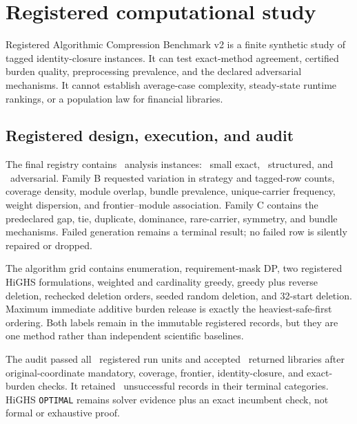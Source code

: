 \section{Registered computational study}
\label{sec:computational-study}
\label{sec:experiments}

Registered Algorithmic Compression Benchmark v2 is a finite synthetic study of
tagged identity-closure instances. It can test exact-method agreement, certified
burden quality, preprocessing prevalence, and the declared adversarial
mechanisms. It cannot establish average-case complexity, steady-state runtime
rankings, or a population law for financial libraries.

\subsection{Registered design, execution, and audit}

The final registry contains \AORBenchmarkInstances\ analysis instances:
\AORBenchmarkSmallExact\ small exact, \AORBenchmarkStructured\ structured,
and \AORBenchmarkAdversarial\ adversarial. Family B requested variation in
strategy and tagged-row counts, coverage density, module overlap, bundle
prevalence, unique-carrier frequency, weight dispersion, and
frontier--module association. Family C contains the predeclared gap, tie,
duplicate, dominance, rare-carrier, symmetry, and bundle mechanisms. Failed
generation remains a terminal result; no failed row is silently repaired or
dropped.

The algorithm grid contains enumeration, requirement-mask DP, two registered
HiGHS formulations, weighted and cardinality greedy, greedy plus reverse
deletion, rechecked deletion orders, seeded random deletion, and 32-start
deletion. Maximum immediate additive burden release is exactly the
heaviest-safe-first ordering. Both labels remain in the immutable registered
records, but they are one method rather than independent scientific baselines.

The audit passed all \AORBenchmarkRuns\ registered run units and accepted
\AORBenchmarkAccepted\ returned libraries after original-coordinate mandatory,
coverage, frontier, identity-closure, and exact-burden checks. It retained
\AORBenchmarkUnsuccessful\ unsuccessful records in their terminal categories.
HiGHS \texttt{OPTIMAL} remains solver evidence plus an exact incumbent check,
not formal or exhaustive proof.

